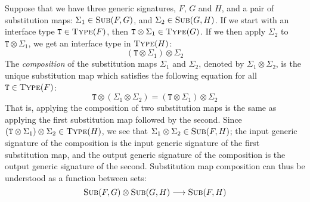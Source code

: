 \documentclass[../generics]{subfiles}
\begin{document}
Suppose that we have three generic signatures, $F$, $G$ and $H$, and a pair of substitution maps: $\Sigma_1\in\textsc{Sub}({F, G})$, and $\Sigma_2\in\textsc{Sub}({G, H})$. If we start with an interface type $\texttt{T}\in\textsc{Type}({F})$, then $\texttt{T}\otimes\Sigma_1\in\textsc{Type}({G})$. If we then apply $\Sigma_2$ to $\texttt{T}\otimes\Sigma_1$, we get an interface type in $\textsc{Type}({H})$:
\[(\texttt{T}\otimes\Sigma_1)\otimes\Sigma_2\]
The \emph{composition} of the substitution maps $\Sigma_1$ and $\Sigma_2$, denoted by \index{$\otimes$}$\Sigma_1\otimes\Sigma_2$, is the unique substitution map which satisfies the following equation for all $\texttt{T}\in\textsc{Type}({F})$:
\[\texttt{T}\otimes(\Sigma_1\otimes\Sigma_2)=(\texttt{T}\otimes\Sigma_1)\otimes\Sigma_2\]
That is, applying the composition of two substitution maps is the same as applying the first substitution map followed by the second. Since $(\texttt{T}\otimes\Sigma_1)\otimes\Sigma_2\in\textsc{Type}({H})$, we see that $\Sigma_1\otimes\Sigma_2\in\textsc{Sub}({F, H})$; the input generic signature of the composition is the input generic signature of the first substitution map, and the output generic signature of the composition is the output generic signature of the second. Substitution map composition can thus be understood as a function between sets:
\[\textsc{Sub}({F, G})\otimes\textsc{Sub}({G, H})\longrightarrow\textsc{Sub}({F, H})\]
\end{document}
